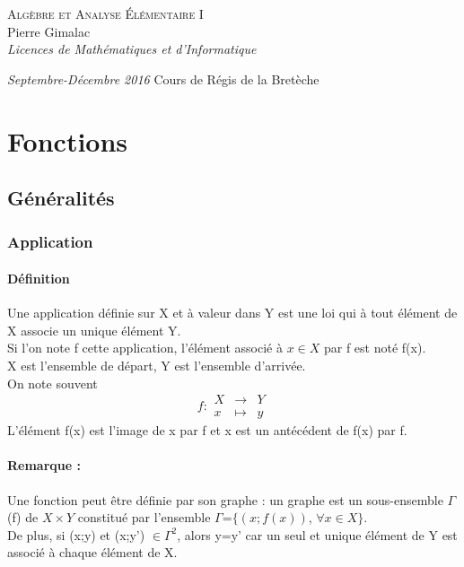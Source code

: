 \documentclass[a4paper,10pt]{book}
\begin{document}
\begin{titlepage}
\thispagestyle{empty}
\begin{center}
\vspace*{7cm}
\Huge \textsc{Algèbre et Analyse Élémentaire I}\\
\vspace{1.5cm}
\Large Pierre Gimalac\\
\vspace{0.5cm}
\large \textit{Licences de Mathématiques et d'Informatique}
\vfill
\end{center}
\large \textit{Septembre-Décembre 2016}
\hfill 
\large Cours de Régis de la Bretèche
\restoregeometry
\end{titlepage}

\renewcommand{\contentsname}{Sommaire}
\thispagestyle{empty}
\tableofcontents \thispagestyle{empty}


\chapter{Fonctions}

\section{Généralités}
\subsection{Application}
\subsubsection*{Définition}
Une application définie sur X et à valeur dans Y est une loi qui à tout élément de X associe un unique élément Y. \\
Si l'on note f cette application, l'élément associé à $x \in X$ par f est noté f(x). \\
X est l'ensemble de départ, Y est l'ensemble d'arrivée. \\
On note souvent \begin{displaymath}
f : \begin{array}{rcl}
X &\longrightarrow & Y \\
x &\longmapsto & y\end{array} \end{displaymath}
L'élément f(x) est l'image de x par f et x est un antécédent de f(x) par f.

\subsubsection*{Remarque :}
Une fonction peut être définie par son graphe : un graphe est un sous-ensemble $\Gamma$(f) de $X \times Y$ constitué par l'ensemble $\Gamma$=$\{(x;f(x))$, $\forall x \in X \}$.\\
De plus, si (x;y) et (x;y') $\in \Gamma ^{2}$, alors y=y' car un seul et unique élément de Y est associé à chaque élément de X.\\
\end{document}
